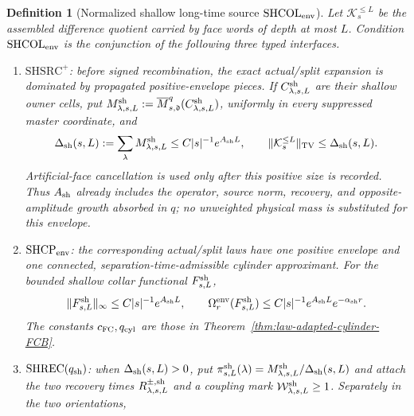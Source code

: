 \documentclass[11pt]{article}
\newtheorem{definition}[theorem]{Definition}
\begin{document}
\begin{definition}[Normalized shallow long-time source
$\mathrm{SHCOL}_{\rm env}$]
\label{def:shallow-collar-envelope}
Let $\mathcal K_s^{\le L}$ be the assembled difference quotient carried by
face words of depth at most $L$.  Condition
$\mathrm{SHCOL}_{\rm env}$ is the conjunction of the following three typed
interfaces.
\begin{enumerate}[label=\textup{(SH\arabic*)}]
\item $\mathrm{SHSRC}^{+}$: before signed recombination, the exact
      actual/split expansion is dominated by propagated positive-envelope
      pieces.  If $C^{\rm sh}_{\lambda,s,L}$ are their shallow owner cells,
      put
      $M^{\rm sh}_{\lambda,s,L}:=
      \overline M_{s,\mathfrak d}^{q}
      (C^{\rm sh}_{\lambda,s,L})$, uniformly in every suppressed master
      coordinate, and
      \begin{equation}
      \label{eq:shallow-positive-source-mass}
       \Delta_{\rm sh}(s,L):=\sum_\lambda
       M^{\rm sh}_{\lambda,s,L}
       \le C|s|^{-1}e^{A_{\rm sh}L},\qquad
       \|\mathcal K_s^{\le L}\|_{\rm TV}\le\Delta_{\rm sh}(s,L).
      \end{equation}
      Artificial-face cancellation is used only after this positive size is
      recorded.  Thus $A_{\rm sh}$ already includes the operator, source
      norm, recovery, and opposite-amplitude growth absorbed in $q$; no
      unweighted physical mass is substituted for this envelope.
\item $\mathrm{SHCP}_{\rm env}$: the corresponding actual/split laws have
      one positive envelope and one connected, separation-time-admissible
      cylinder approximant.  For the bounded shallow collar functional
      $F^{\rm sh}_{s,L}$,
\begin{equation}
\label{eq:shallow-collar-envelope}
 \|F^{\rm sh}_{s,L}\|_\infty
 \le C|s|^{-1}e^{A_{\rm sh}L},\qquad
 \Omega_r^{\rm env}(F^{\rm sh}_{s,L})
 \le C|s|^{-1}e^{A_{\rm sh}L}e^{-\alpha_{\rm sh}r}.
\end{equation}
      The constants $c_{\rm FC},q_{\rm cyl}$ are those in
      Theorem~\ref{thm:law-adapted-cylinder-FCB}.
\item $\mathrm{SHREC}(q_{\rm sh})$: when
      $\Delta_{\rm sh}(s,L)>0$, put
      $\pi^{\rm sh}_{s,L}(\lambda)=
      M^{\rm sh}_{\lambda,s,L}/\Delta_{\rm sh}(s,L)$ and attach the two
      recovery times $R^{\pm,\rm sh}_{\lambda,s,L}$ and a coupling mark
      $\mathcal W^{\rm sh}_{\lambda,s,L}\ge1$.  Separately in the two
      orientations,

\end{enumerate}
\end{definition}
\end{document}
